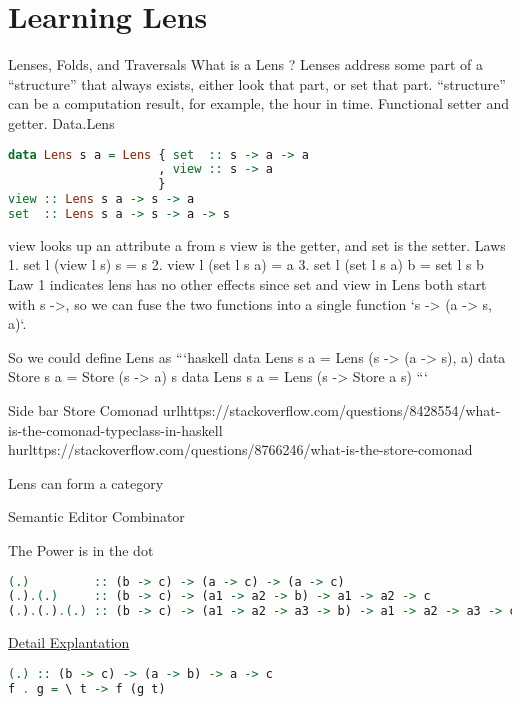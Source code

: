 \chapter{Learning Lens}


Lenses, Folds, and Traversals
What is a Lens ?
Lenses address some part of a “structure” that always exists, either look that part, or set that part.
“structure” can be a computation result, for example, the hour in time. Functional setter and getter.
  Data.Lens


\begin{lstlisting}[language=haskell]
data Lens s a = Lens { set  :: s -> a -> a
                     , view :: s -> a
                     }
view :: Lens s a -> s -> a
set  :: Lens s a -> s -> a -> s
\end{lstlisting}

view looks up an attribute a from s
view is the getter, and set is the setter.
Laws
1. set l (view l s) s = s
2. view l (set l s a) = a
3. set l (set l s a) b = set l s b
Law 1 indicates lens has no other effects
since set and view in Lens both start with s ->, so we can fuse the two functions into a single function
`s -> (a -> s, a)`.

So we could define Lens as
```haskell
data Lens s a = Lens (s -> (a -> s), a)
data Store s a = Store (s -> a) s
data Lens s a = Lens (s -> Store a s)
```

Side bar Store Comonad
url{https://stackoverflow.com/questions/8428554/what-is-the-comonad-typeclass-in-haskell}
hurl{ttps://stackoverflow.com/questions/8766246/what-is-the-store-comonad}

Lens can form a category

 Semantic Editor Combinator

The Power is in the dot
\begin{lstlisting}[language=haskell]
(.)         :: (b -> c) -> (a -> c) -> (a -> c)
(.).(.)     :: (b -> c) -> (a1 -> a2 -> b) -> a1 -> a2 -> c
(.).(.).(.) :: (b -> c) -> (a1 -> a2 -> a3 -> b) -> a1 -> a2 -> a3 -> c
\end{lstlisting}

\href{https://www.reddit.com/r/haskellquestions/comments/ayi445/help_me_understand_the_function_and_its_type}{Detail Explantation}

\begin{lstlisting}[language=haskell]
(.) :: (b -> c) -> (a -> b) -> a -> c
f . g = \ t -> f (g t)
\end{lstlisting}



